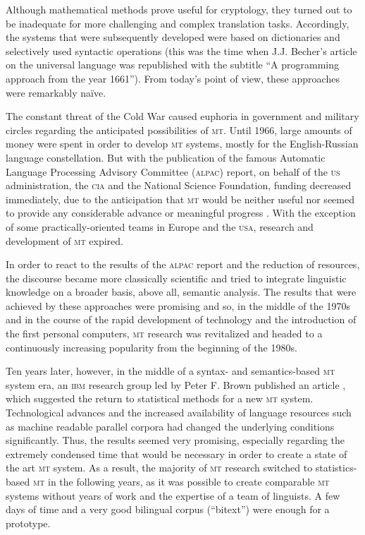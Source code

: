 \documentclass[output=paper]{LSP/langsci}
\begin{document}
Although mathematical methods prove useful for cryptology, they turned out to be inadequate for more challenging and complex translation tasks. Accordingly, the systems that were subsequently developed were based on dictionaries and selectively used syntactic operations (this was the time when J.J. Becher's article on the universal language was republished with the subtitle ``A programming approach from the year 1661''). From today's point of view, these approaches were remarkably naïve.
 
The constant threat of the Cold War caused euphoria in government and military circles regarding the anticipated possibilities of \textsc{mt}. Until 1966, large amounts of money were spent in order to develop \textsc{mt} systems, mostly for the English-Russian language constellation. But with the publication of the famous Automatic Language Processing Advisory Committee (\textsc{alpac}) report, on behalf of the \textsc{us} administration, the \textsc{cia} and the National Science Foundation, funding decreased immediately, due to the anticipation that \textsc{mt} would be neither useful nor seemed to provide any considerable advance or meaningful progress \citep{Hutchings1996}. With the exception of some practically-oriented teams in Europe and the \textsc{usa}, research and development of \textsc{mt} expired.
 
In order to react to the results of the \textsc{alpac} report and the reduction of resources, the discourse became more classically scientific and tried to integrate linguistic knowledge on a broader basis, above all, semantic analysis. The results that were achieved by these approaches were promising and so, in the middle of the 1970s and in the course of the rapid development of technology and the introduction of the first personal computers, \textsc{mt} research was revitalized and headed to a continuously increasing popularity from the beginning of the 1980s.
 
Ten years later, however, in the middle of a syntax- and semantics-based \textsc{mt} system era, an \textsc{ibm} research group led by Peter F. Brown published an article \citep{Brown1988}, which suggested the return to statistical methods for a new \textsc{mt} system. Technological advances and the increased availability of language resources such as machine readable parallel corpora had changed the underlying conditions significantly. Thus, the results seemed very promising, especially regarding the extremely condensed time that would be necessary in order to create a state of the art \textsc{mt} system. As a result, the majority of \textsc{mt} research switched to statistics-based \textsc{mt} in the following years, as it was possible to create comparable \textsc{mt} systems without years of work and the expertise of a team of linguists. A few days of time and a very good bilingual corpus (``bitext'') were enough for a prototype.
 
\end{document}
